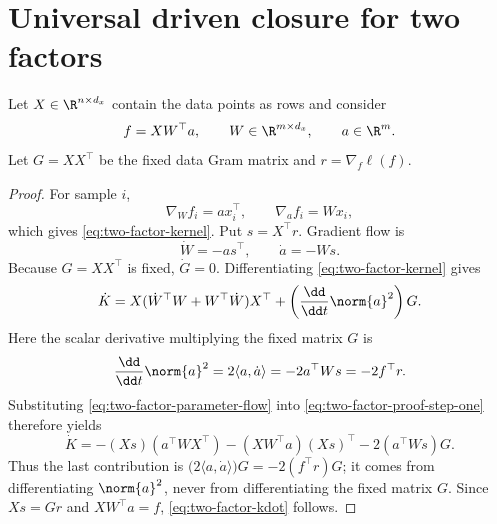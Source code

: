 \section{Universal driven closure for two factors}
\label{sec:two-factor}

Let $X\in\R^{n\times d_x}$ contain the data points as rows and consider
\begin{equation}
  f=XW^\top a,
  \qquad
  W\in\R^{m\times d_x},
  \qquad
  a\in\R^m.
  \label{eq:two-factor-model}
\end{equation}
Let $G=XX^\top$ be the fixed data Gram matrix and $r=\nabla_f\ell(f)$.


\begin{proof}
For sample $i$,
\begin{equation}
  \nabla_W f_i=a x_i^\top,
  \qquad
  \nabla_a f_i=Wx_i,
\end{equation}
which gives \eqref{eq:two-factor-kernel}.  Put $s=X^\top r$.  Gradient flow is
\begin{equation}
  \dot W=-a s^\top,
  \qquad
  \dot a=-Ws.
  \label{eq:two-factor-parameter-flow}
\end{equation}
Because $G=XX^\top$ is fixed, $\dot G=0$.  Differentiating \eqref{eq:two-factor-kernel} gives
\begin{equation}
  \dot K
  =X(\dot W^\top W+W^\top\dot W)X^\top
   +\left(\frac{\dd}{\dd t}\norm{a}^2\right)G.
  \label{eq:two-factor-proof-step-one}
\end{equation}
Here the scalar derivative multiplying the fixed matrix $G$ is
\[
  \frac{\dd}{\dd t}\norm{a}^2
  =2\langle a,\dot a\rangle
  =-2a^\top Ws
  =-2f^\top r.
\]
Substituting \eqref{eq:two-factor-parameter-flow} into \eqref{eq:two-factor-proof-step-one} therefore yields
\begin{equation}
  \dot K
  =-(Xs)(a^\top WX^\top)-(XW^\top a)(Xs)^\top
   -2(a^\top Ws)G.
  \label{eq:two-factor-proof-substitution}
\end{equation}
Thus the last contribution is $\bigl(2\langle a,\dot a\rangle\bigr)G=-2(f^\top r)G$; it comes from differentiating $\norm{a}^2$, never from differentiating the fixed matrix $G$.  Since $Xs=Gr$ and $XW^\top a=f$, \eqref{eq:two-factor-kdot} follows.
\end{proof}


